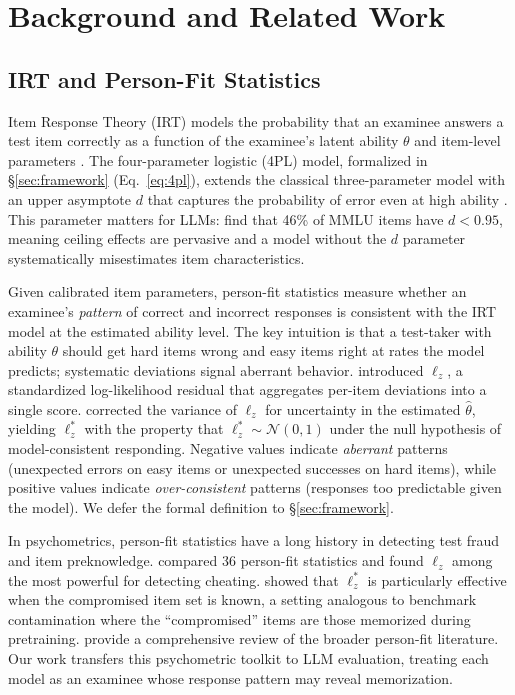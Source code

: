 \section{Background and Related Work}\label{sec:background}

\subsection{IRT and Person-Fit Statistics}\label{sec:irt_background}

Item Response Theory (IRT) models the probability that an examinee answers a test item correctly as a function of the examinee's latent ability $\theta$ and item-level parameters \citep{lord1980, embretson2000}.
The four-parameter logistic (4PL) model, formalized in \S\ref{sec:framework} (Eq.~\ref{eq:4pl}), extends the classical three-parameter model \citep{birnbaum1968} with an upper asymptote $d$ that captures the probability of error even at high ability \citep{barton1981}.
This parameter matters for LLMs: \citet{psnirt2026} find that 46\% of MMLU items have $d < 0.95$, meaning ceiling effects are pervasive and a model without the $d$ parameter systematically misestimates item characteristics.

Given calibrated item parameters, person-fit statistics measure whether an examinee's \emph{pattern} of correct and incorrect responses is consistent with the IRT model at the estimated ability level.
The key intuition is that a test-taker with ability $\theta$ should get hard items wrong and easy items right at rates the model predicts; systematic deviations signal aberrant behavior.
\citet{drasgow1985} introduced $\ell_z$, a standardized log-likelihood residual that aggregates per-item deviations into a single score.
\citet{snijders2001} corrected the variance of $\ell_z$ for uncertainty in the estimated $\hat{\theta}$, yielding $\ell_z^*$ with the property that $\ell_z^* \sim \mathcal{N}(0,1)$ under the null hypothesis of model-consistent responding.
Negative values indicate \emph{aberrant} patterns (unexpected errors on easy items or unexpected successes on hard items), while positive values indicate \emph{over-consistent} patterns (responses too predictable given the model).
We defer the formal definition to \S\ref{sec:framework}.

In psychometrics, person-fit statistics have a long history in detecting test fraud and item preknowledge.
\citet{karabatsos2003} compared 36 person-fit statistics and found $\ell_z$ among the most powerful for detecting cheating.
\citet{sinharay2017} showed that $\ell_z^*$ is particularly effective when the compromised item set is known, a setting analogous to benchmark contamination where the ``compromised'' items are those memorized during pretraining.
\citet{meijer2001} provide a comprehensive review of the broader person-fit literature.
Our work transfers this psychometric toolkit to LLM evaluation, treating each model as an examinee whose response pattern may reveal memorization.

